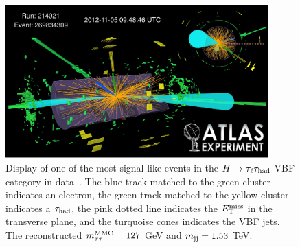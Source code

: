 \begin{figure}[tp]
  \centering
  \includegraphics[width=0.90\textwidth]{figures/HIGG-2013-32/figaux_19}
  \caption{Display of one of the most signal-like events in the $H\rightarrow\tau_\ell\tau_\text{had}$ VBF category in data~\cite{HIGG-2013-32}. The blue track matched to the green cluster indicates an electron, the green track matched to the yellow cluster indicates a $\tau_\text{had}$, the pink dotted line indicates the $E_{\mathrm{T}}^{\mathrm{miss}}$ in the transverse plane, and the turquoise cones indicates the VBF jets. The reconstructed $m_{\tau\tau}^\text{MMC} = 127$ GeV and $m_{\text{jj}} = 1.53$ TeV.}
  \label{fig:results-eventdisplay}
\end{figure}

